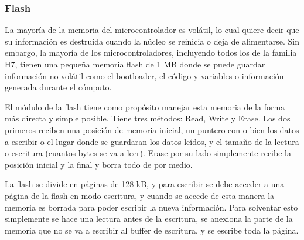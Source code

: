 \documentclass{report}
\begin{document}
\subsubsection{Flash}
La mayoría de la memoria del microcontrolador es volátil, lo cual quiere decir que su información es destruida cuando la núcleo se reinicia o deja de alimentarse. Sin embargo, la mayoría de los microcontroladores, incluyendo todos los de la familia H7, tienen una pequeña memoria flash de 1 MB donde se puede guardar información no volátil como el bootloader, el código y variables o información generada durante el cómputo. \par
El módulo de la flash tiene como propósito manejar esta memoria de la forma más directa y simple posible. Tiene tres métodos: Read, Write y Erase. Los dos primeros reciben una posición de memoria inicial, un puntero con o bien los datos a escribir o el lugar donde se guardaran los datos leídos, y el tamaño de la lectura o escritura (cuantos bytes se va a leer). Erase por su lado simplemente recibe la posición inicial y la final y borra todo de por medio. \par \vspace{0.3cm}
La flash se divide en páginas de 128 kB, y para escribir se debe acceder a una página de la flash en modo escritura, y cuando se accede de esta manera la memoria es borrada para poder escribir la nueva información. Para solventar esto simplemente se hace una lectura antes de la escritura, se anexiona la parte de la memoria que no se va a escribir al buffer de escritura, y se escribe toda la página.
\end{document}
